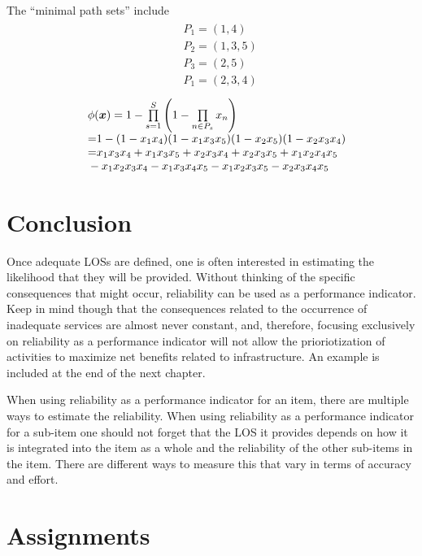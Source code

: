 The ``minimal path sets'' include
\begin{eqnarray}
&& \begin{array}{l}
{P_1} = (1,4)\\
{P_2} = (1,3,5)\\
{P_3} = (2,5)\\
{P_1} = (2,3,4)
\end{array} \nonumber
\end{eqnarray}
%
\begin{eqnarray}
&& \begin{array}{l}
\phi (\vec x) = 1 - \prod\limits_{s = 1}^S {\left( {1 - \prod\limits_{n \in
{P_s}} {{x_n}} } \right)} \\
{\rm{         = }}1 - (1 - {x_1}{x_4})(1 - {x_1}{x_3}{x_5})(1 - {x_2}{x_5})(1 -
{x_2}{x_3}{x_4})\\
{\rm{         = }}{x_1}{x_3}{x_4} + {x_1}{x_3}{x_5} + {x_2}{x_3}{x_4} +
{x_2}{x_3}{x_5} + {x_1}{x_2}{x_4}{x_5}\\
{\rm{          }} - {x_1}{x_2}{x_3}{x_4} - {x_1}{x_3}{x_4}{x_5} -
{x_1}{x_2}{x_3}{x_5} - {x_2}{x_3}{x_4}{x_5}
\end{array}
\label{eqreliability:26}
\end{eqnarray}
\section{Conclusion}
Once adequate LOSs are defined, one is often interested in estimating the
likelihood that they will be provided. Without thinking of the specific
consequences that might occur, reliability can be used as a performance
indicator. Keep in mind though that the consequences related to the occurrence of
inadequate services are almost never constant, and, therefore, focusing
exclusively on reliability as a performance indicator will not allow the
prioriotization of activities to maximize net benefits related to infrastructure.
An example is included at the end of the next chapter.

When using reliability as a performance indicator for an item, there are
multiple ways to estimate the reliability. When using reliability as a
performance indicator for a sub-item one should not forget that the LOS it
provides depends on how it is integrated into the item as a whole and the
reliability of the other sub-items in the item. There are different ways to
measure this that vary in terms of accuracy and effort.
%
\section{Assignments}
